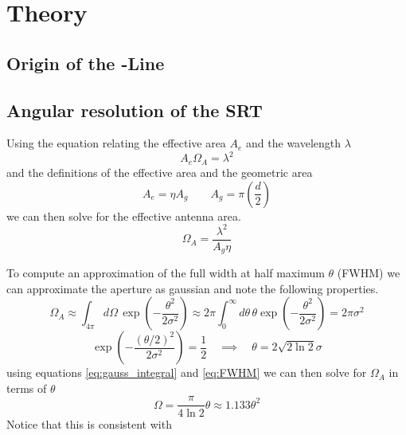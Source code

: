 \section{Theory}

\subsection[Origin of the HI-Line]{Origin of the -Line}

\subsection{Angular resolution of the SRT}\label{sec:ang_res}
Using the equation relating the effective area $A_e$ and the wavelength $\lambda$ \cite[p. 149]{wilson}
\begin{equation}
    A_e \Omega_A = \lambda^2
\end{equation}
and the definitions of the effective area and the geometric area \cite[p. 148]{wilson}
\begin{equation}
    A_e = \eta A_g \qquad A_g = \pi \left( \frac{d}{2} \right) \label{eq:A_e}
\end{equation}
we can then solve for the effective antenna area.
\begin{equation}
    \Omega_A = \frac{\lambda^2}{A_g \eta} \label{eq:Omega_A}
\end{equation}


To compute an approximation of the full width at half maximum $\theta$ (FWHM) we can approximate the aperture as gaussian \cite[p. 2]{srt} and note the following properties.
\begin{equation}
    \Omega_A \approx \int_{4\pi } d\Omega\, \exp{\left( -\frac{\theta^2}{2\sigma^2} \right)} \approx 2\pi \int_0^{\infty} d\theta \, \theta \exp{\left( -\frac{\theta^2}{2\sigma^2} \right)} = 2\pi \sigma^2
    \label{eq:gauss_integral}
\end{equation}
\begin{equation}
    \exp{\left( -\frac{(\theta/2)^2}{2\sigma^2}\right)} = \frac{1}{2} \quad \implies \quad \theta = 2 \sqrt{2\ln{2}} \sigma \label{eq:FWHM}
\end{equation}
using equations \eqref{eq:gauss_integral} and \eqref{eq:FWHM} we can then solve for $\Omega_A$ in terms of $\theta$
\begin{equation}
    \Omega = \frac{\pi}{4\ln{2}} \theta \approx 1.133 \theta^2 \label{eq:Omega_A_fwhhm}
\end{equation}
Notice that this is consistent with \cite[p.178 (8.13)]{wilson}


